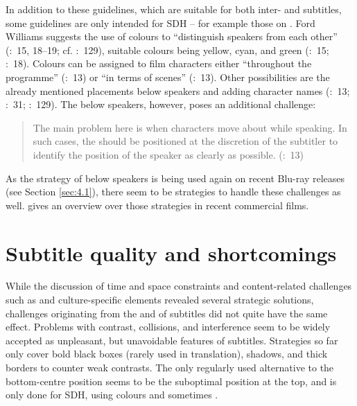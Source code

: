 In addition to these guidelines, which are suitable for both inter- and  subtitles, some guidelines are only intended for SDH – for example those on . Ford Williams suggests the use of colours to “distinguish speakers from each other” (\citeyear{Ford_williams2009}:~15, 18--19; cf. \citealt{Jungst2010}:~129), suitable colours being yellow, cyan, and green (\citealt{Itc1999}:~15; \citealt{Ford_williams2009}:~18). Colours can be assigned to film characters either “throughout the programme” (\citealt{Itc1999}:~13) or “in terms of scenes” (\citealt{Itc1999}:~13). Other possibilities are the already mentioned placements below speakers and adding character names (\citealt{Itc1999}:~13; \citealt{remael2007}:~31; \citealt{Jungst2010}:~129). The  below speakers, however, poses an additional challenge:
\begin{quote}
The main problem here is when characters move about while speaking. In such cases, the  should be positioned at the discretion of the subtitler to identify the position of the speaker as clearly as possible. (\citealt{Itc1999}:~13)
\end{quote}
As the strategy of  below speakers is being used again on recent Blu-ray releases (see Section \ref{sec:4.1}), there seem to be strategies to handle these challenges as well.  gives an overview over those strategies in recent commercial films.

\section{Subtitle quality and shortcomings}\label{sec:1.3}

\largerpage
While the discussion of time and space constraints and content-related challenges such as  and culture-specific elements revealed several strategic solutions, challenges originating from the  and  of subtitles did not quite have the same effect. Problems with contrast, collisions, and interference seem to be widely accepted as unpleasant, but unavoidable features of subtitles. Strategies so far only cover bold black boxes (rarely used in  translation), shadows, and thick borders to counter weak contrasts. The only regularly used alternative to the bottom-centre position seems to be the suboptimal position at the top, and  is only done for SDH, using colours and sometimes .

